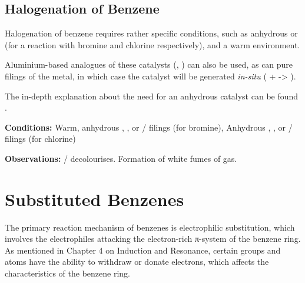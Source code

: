 			\pagebreak
			\subsection{Halogenation of Benzene}

				Halogenation of benzene requires rather specific conditions, such as anhydrous  or  (for a reaction
				with bromine and chlorine respectively), and a warm environment.

				Aluminium-based analogues of these catalysts (, ) can also be used, as can pure
				filings of the metal, in which case the catalyst will be generated \textit{in-situ} ( +  -> ).

				The in-depth explanation about the need for an anhydrous catalyst can be found \hyperlink{BenzeneHalogenationCatalyst}{}.

				\vspace{1.5em}
				\vbox{\textbf{Conditions:}	\tabto{35mm}Warm, anhydrous , , or  / \ch{\aluminium} filings (for bromine),
											\tabto{35mm}Anhydrous , , or
														 / \ch{\aluminium} filings (for chlorine)}

				\vspace{0.75em}
				\vbox{\textbf{Observations:}\tabto{35mm}  /   decolourises.
											\tabto{35mm}Formation of white fumes of  gas.}



		\pagebreak
		\section{Substituted Benzenes}

			The primary reaction mechanism of benzenes is electrophilic substitution, which involves the electrophiles attacking the
			electron-rich π-system of the benzene ring. As mentioned in Chapter 4 on Induction and Resonance, certain groups and atoms
			have the ability to withdraw or donate electrons, which affects the characteristics of the benzene ring.



